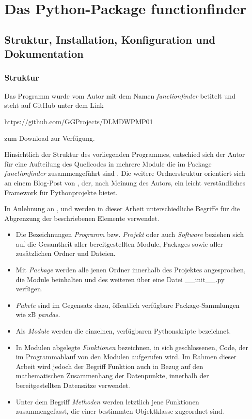 \chapter{Das Python-Package functionfinder}

\section{Struktur, Installation, Konfiguration und Dokumentation}

\subsection{Struktur}

Das Programm wurde vom Autor mit dem Namen \emph{\glqq functionfinder\grqq} betitelt und steht auf GitHub unter dem Link \begin{center}\url{https://github.com/GGProjects/DLMDWPMP01}\end{center} zum Download zur Verfügung.

Hinsichtlich der Struktur des vorliegenden Programmes, entschied sich der Autor für eine Aufteilung des Quellcodes in mehrere Module die im Package \emph{functionfinder} zusammengeführt sind \citep[S. 242]{kofler_python_2022}. Die weitere Ordnerstruktur orientiert sich an einem Blog-Post von \cite{henk_griffioen_how_2017}, der, nach Meinung des Autors, ein leicht verständliches Framework für Pythonprojekte bietet.

In Anlehnung an \cite{croitoru_programmieren_2022}, \cite{kofler_python_2022} und \cite{henk_griffioen_how_2017} werden in dieser Arbeit unterschiedliche Begriffe für die Abgrenzung der beschriebenen Elemente verwendet.

\begin{itemize}
 \itemsep0pt
 \item Die Bezeichnungen \emph{Programm} bzw. \emph{Projekt} oder auch \emph{Software} beziehen sich auf die Gesamtheit aller bereitgestellten Module, Packages sowie aller zusätzlichen Ordner und Dateien.
 \item Mit \emph{Package} werden alle jenen Ordner innerhalb des Projektes angesprochen, die Module beinhalten und des weiteren über eine Datei \_\_init\_\_.py verfügen.
 \item \emph{Pakete} sind im Gegensatz dazu, öffentlich verfügbare Package-Sammlungen wie zB \emph{pandas}.
 \item Als \emph{Module} werden die einzelnen, verfügbaren Pythonskripte bezeichnet.
 \item In Modulen abgelegte \emph{Funktionen} bezeichnen, in sich geschlossenen, Code, der im Programmablauf von den Modulen aufgerufen wird. Im Rahmen dieser Arbeit wird jedoch der Begriff Funktion auch in Bezug auf den mathematischen Zusammenhang der Datenpunkte, innerhalb der bereitgestellten Datensätze verwendet.
 \item Unter dem Begriff \emph{Methoden} werden letztlich jene Funktionen zusammengefasst, die einer bestimmten Objektklasse zugeordnet sind.
\end{itemize}

